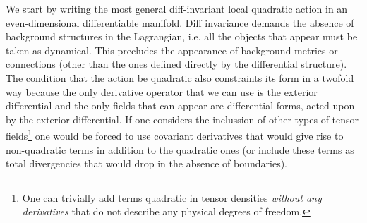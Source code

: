 \documentclass[prd,a4paper,twocolumn,amssymb,amsmath,nofootinbib,showpacs]{revtex4}
\begin{document}
We start by writing the most general diff-invariant local
quadratic action in an even-dimensional differentiable manifold.
Diff invariance demands the absence of background structures in
the Lagrangian, i.e. all the objects that appear must be taken as
dynamical. This precludes the appearance of background metrics or
connections (other than the ones defined directly by the
differential structure). The condition that the action be
quadratic also constraints its form in a twofold way because the
only derivative operator that we can use is the exterior
differential  and the only fields that can appear are differential
forms, acted upon by the exterior differential. If one considers
the inclussion of other types of tensor fields\footnote{One can
trivially add terms quadratic in tensor densities \emph{without
any derivatives} that do not describe any physical degrees of
freedom.} one would be forced to use covariant derivatives that
would give rise to non-quadratic terms in addition to the
quadratic ones (or include these terms as total divergencies that
would drop in the absence of boundaries).
\end{document}
